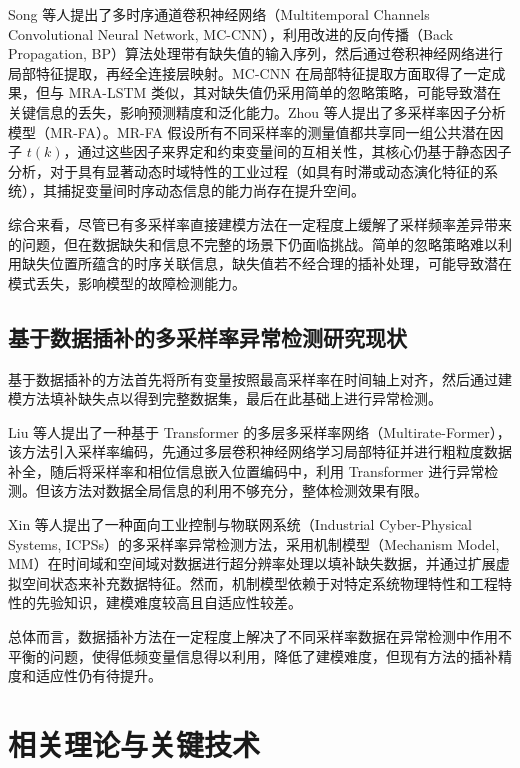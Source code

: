 \documentclass[bachelor, vlined]{DissertUESTC}
\begin{document}
    Song 等人提出了多时序通道卷积神经网络（Multitemporal Channels Convolutional Neural Network, MC-CNN），利用改进的反向传播（Back Propagation, BP）算法处理带有缺失值的输入序列，然后通过卷积神经网络进行局部特征提取，再经全连接层映射。MC-CNN 在局部特征提取方面取得了一定成果，但与 MRA-LSTM 类似，其对缺失值仍采用简单的忽略策略，可能导致潜在关键信息的丢失，影响预测精度和泛化能力。Zhou 等人提出了多采样率因子分析模型（MR-FA）。MR-FA 假设所有不同采样率的测量值都共享同一组公共潜在因子 $t(k)$，通过这些因子来界定和约束变量间的互相关性，其核心仍基于静态因子分析，对于具有显著动态时域特性的工业过程（如具有时滞或动态演化特征的系统），其捕捉变量间时序动态信息的能力尚存在提升空间。

    综合来看，尽管已有多采样率直接建模方法在一定程度上缓解了采样频率差异带来的问题，但在数据缺失和信息不完整的场景下仍面临挑战。简单的忽略策略难以利用缺失位置所蕴含的时序关联信息，缺失值若不经合理的插补处理，可能导致潜在模式丢失，影响模型的故障检测能力。

    \subsection{基于数据插补的多采样率异常检测研究现状}

    基于数据插补的方法首先将所有变量按照最高采样率在时间轴上对齐，然后通过建模方法填补缺失点以得到完整数据集，最后在此基础上进行异常检测。

    Liu 等人提出了一种基于 Transformer 的多层多采样率网络（Multirate-Former），该方法引入采样率编码，先通过多层卷积神经网络学习局部特征并进行粗粒度数据补全，随后将采样率和相位信息嵌入位置编码中，利用 Transformer 进行异常检测。但该方法对数据全局信息的利用不够充分，整体检测效果有限。

    Xin 等人提出了一种面向工业控制与物联网系统（Industrial Cyber-Physical Systems, ICPSs）的多采样率异常检测方法，采用机制模型（Mechanism Model, MM）在时间域和空间域对数据进行超分辨率处理以填补缺失数据，并通过扩展虚拟空间状态来补充数据特征。然而，机制模型依赖于对特定系统物理特性和工程特性的先验知识，建模难度较高且自适应性较差。

    总体而言，数据插补方法在一定程度上解决了不同采样率数据在异常检测中作用不平衡的问题，使得低频变量信息得以利用，降低了建模难度，但现有方法的插补精度和适应性仍有待提升。

    \section{相关理论与关键技术}
\end{document}
